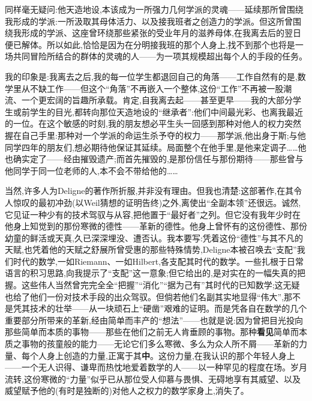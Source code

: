 同样毫无疑问:他天造地设,本该成为一所强力几何学派的灵魂——延续那所曾围绕我形成的学派:一所汲取其母体活力、以及接我班者之创造力的学派。但这所曾围绕我形成的学派、这座曾环绕那些紧张的受业年月的滋养母体,在我离去后的翌日便已解体。所以如此,恰恰是因为在分明接我班的那个人身上,找不到那个也将是一场共同冒险所结合的群体的灵魂的人——为一项其规模超出每个人的手段的任务。

我的印象是:我离去之后,我的每一位学生都退回自己的角落——工作自然有的是,数学里从不缺工作——但这个“角落”不再嵌入一个整体,这份“工作”不再被一股潮流、一个更宏阔的旨趣所承载。肯定,自我离去起——甚至更早——我的大部分学生或前学生的目光,都转向那位天造地设的“继承者”:他们中间最光彩、也离我最近的一位。在这个敏感的时刻,我的朋友想必平生头一回感到那种对他人的权力突然握在自己手里:那种对一个学派的命运生杀予夺的权力——那学派,他出身于斯;与他同学四年的朋友们,想必期待他保证其延续。局面整个在他手里,是他来定调子……他也确实定了——经由摧毁遗产;而首先摧毁的,是那份信任与那份期待——那些曾与他同学于同一位老师的人,本不会不带给他的……

当然,许多人为Deligne的著作所折服,并非没有理由。但我也清楚:这部著作,在其令人惊叹的最初冲劲(以Weil猜想的证明告终)之外,离使出“全副本领”还很远。诚然,它见证一种少有的技术驾驭与从容,把他置于“最好者”之列。但它没有我年少时在他身上知觉到的那份寒微的德性——革新的德性。他身上曾怀有的这份德性、那份幼童的鲜活或天真,久已深深埋没、遭否认。我本要写:凭着这份“德性”与其不凡的天赋\dmark{},也凭着他的天赋之舒展所曾受惠的那些特殊情势,Deligne本被召唤去“支配”我们时代的数学,一如Riemann、一如Hilbert,各支配其时代的数学。一些扎根于日常语言的积习思路,向我提示了“支配”这一意象;但它给出的,是对实在的一幅失真的把握。这些伟人当然曾完完全全“把握”“消化”“据为己有”其时代的已知数学;这无疑也给了他们一份对技术手段的出众驾驭。但倘若他们名副其实地显得“伟大”,那不是凭其技术的壮举——从一块顽石上“硬凿”艰难的证明。而是凭各自在数学的几个重要部分所带来的革新,经由简单而丰产的“想法”——也就是说:因为曾把目光投向那些简单而本质的事物——那些在他们之前无人肯垂顾的事物。那种\textbf{看见}简单而本质之事物的孩童般的能力——无论它们多么寒微、多么为众人所不屑——革新的力量、每个人身上创造的力量,正寓于其\textbf{中}。这份力量,在我认识的那个年轻人身上——一个无人识得、谦卑而热忱地爱着数学的人——以一种罕见的程度在场。岁月流转,这份寒微的“力量”似乎已从那位受人仰慕与畏惧、无碍地享有其威望、以及威望赋予他的(有时是独断的)对他人之权力的数学家身上,消失了。

